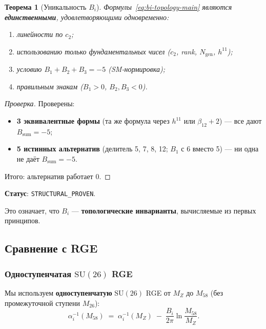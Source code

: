\documentclass[11pt,a4paper]{article}
\newcommand{\SU}{\ensuremath{\mathrm{SU}}}
\newtheorem{theorem}{Теорема}[section]
\theoremstyle{definition}
\begin{document}
\begin{theorem}[Уникальность $B_i$]
\label{thm:bi-uniqueness}
Формулы~\eqref{eq:bi-topology-main} являются \textbf{единственными},
удовлетворяющими одновременно:
\begin{enumerate}
    \item линейности по $c_2$;
    \item использованию только фундаментальных чисел
          ($c_2$, rank, $N_{\text{gen}}$, $h^{11}$);
    \item условию $B_1 + B_2 + B_3 = -5$ (SM-нормировка);
    \item правильным знакам ($B_1 > 0$, $B_2, B_3 < 0$).
\end{enumerate}
\end{theorem}

\begin{proof}[Проверка]
Проверены:
\begin{itemize}
    \item \textbf{3 эквивалентные формы}
          (та же формула через $h^{11}$ или $\beta_{12}+2$) —
          все дают $B_{\text{sum}} = -5$;
    \item \textbf{5 истинных альтернатив}
          (делитель 5, 7, 8, 12; $B_1$ с 6 вместо 5) —
          ни одна не даёт $B_{\text{sum}} = -5$.
\end{itemize}
Итого: альтернатив работает $0$.
\end{proof}

\medskip\noindent
\textbf{Статус}: \texttt{STRUCTURAL\_PROVEN}.                                  

\medskip\noindent
Это означает, что $B_i$ --- \textbf{топологические инварианты},
вычисляемые из первых принципов.

\subsection{Сравнение с RGE}
\label{subsec:bi-comparison}

\subsubsection{Одноступенчатая \texorpdfstring{$\SU(26)$}{(26)} RGE}

Мы используем \textbf{одноступенчатую} $\SU(26)$ RGE от $M_Z$
до $M_{58}$ (без промежуточной ступени $M_{26}$):
\begin{equation}
    \alpha_i^{-1}(M_{58}) \;=\; \alpha_i^{-1}(M_Z)
    \;-\; \frac{B_i}{2\pi} \ln\frac{M_{58}}{M_Z}.
    \label{eq:rge-one-step}
\end{equation}
\end{document}
